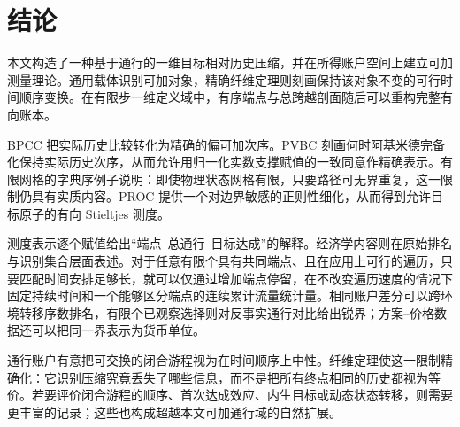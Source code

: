 \section{结论}\label{sec:conclusion}

本文构造了一种基于通行的一维目标相对历史压缩，并在所得账户空间上建立可加测量理论。通用载体识别可加对象，精确纤维定理则刻画保持该对象不变的可行时间顺序变换。在有限步一维定义域中，有序端点与总跨越剖面随后可以重构完整有向账本。

BPCC 把实际历史比较转化为精确的偏可加次序。PVBC 刻画何时阿基米德完备化保持实际历史次序，从而允许用归一化实数支撑赋值的一致同意作精确表示。有限网格的字典序例子说明：即使物理状态网格有限，只要路径可无界重复，这一限制仍具有实质内容。PROC 提供一个对边界敏感的正则性细化，从而得到允许目标原子的有向 Stieltjes 测度。

测度表示逐个赋值给出“端点--总通行--目标达成”的解释。经济学内容则在原始排名与识别集合层面表述。对于任意有限个具有共同端点、且在应用上可行的遍历，只要匹配时间安排足够长，就可以仅通过增加端点停留，在不改变遍历速度的情况下固定持续时间和一个能够区分端点的连续累计流量统计量。相同账户差分可以跨环境转移序数排名，有限个已观察选择则对反事实通行对比给出锐界；方案--价格数据还可以把同一界表示为货币单位。

通行账户有意把可交换的闭合游程视为在时间顺序上中性。纤维定理使这一限制精确化：它识别压缩究竟丢失了哪些信息，而不是把所有终点相同的历史都视为等价。若要评价闭合游程的顺序、首次达成效应、内生目标或动态状态转移，则需要更丰富的记录；这些也构成超越本文可加通行域的自然扩展。
